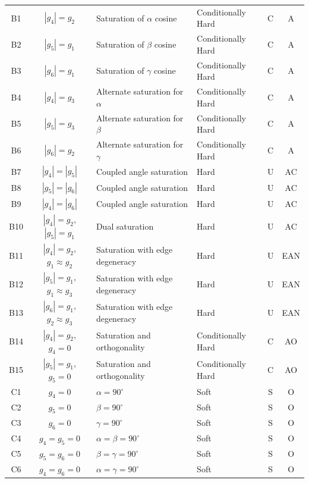 \documentclass[preprint]{iucr}              %
\begin{document}
\begin{longtable}{|c|c|p{5.2cm}|p{3.8cm}|c|c|}
	B1 & $|g_4| = g_2$ & Saturation of $\alpha$ cosine & Conditionally Hard & C & A \\
	B2 & $|g_5| = g_1$ & Saturation of $\beta$ cosine & Conditionally Hard & C & A \\
	B3 & $|g_6| = g_1$ & Saturation of $\gamma$ cosine & Conditionally Hard & C & A \\
	B4 & $|g_4| = g_3$ & Alternate saturation for $\alpha$ & Conditionally Hard & C & A \\
	B5 & $|g_5| = g_3$ & Alternate saturation for $\beta$ & Conditionally Hard & C & A \\
	B6 & $|g_6| = g_2$ & Alternate saturation for $\gamma$ & Conditionally Hard & C & A \\
	B7 & $|g_4| = |g_5|$ & Coupled angle saturation & Hard & U & AC \\
	B8 & $|g_5| = |g_6|$ & Coupled angle saturation & Hard & U & AC \\
	B9 & $|g_4| = |g_6|$ & Coupled angle saturation & Hard & U & AC \\
	B10 & $|g_4| = g_2$, $|g_5| = g_1$ & Dual saturation & Hard & U & AC \\
	B11 & $|g_4| = g_2$, $g_1 \approx g_2$ & Saturation with edge degeneracy & Hard & U & EAN \\
	B12 & $|g_5| = g_1$, $g_1 \approx g_3$ & Saturation with edge degeneracy & Hard & U & EAN \\
	B13 & $|g_6| = g_1$, $g_2 \approx g_3$ & Saturation with edge degeneracy & Hard & U & EAN \\
	B14 & $|g_4| = g_2$, $g_4 = 0$ & Saturation and orthogonality & Conditionally Hard & C & AO \\
	B15 & $|g_5| = g_1$, $g_5 = 0$ & Saturation and orthogonality & Conditionally Hard & C & AO \\
	
	C1 & $g_4 = 0$ & $\alpha = 90^\circ$ & Soft & S & O \\
	C2 & $g_5 = 0$ & $\beta = 90^\circ$ & Soft & S & O \\
	C3 & $g_6 = 0$ & $\gamma = 90^\circ$ & Soft & S & O \\
	C4 & $g_4 = g_5 = 0$ & $\alpha = \beta = 90^\circ$ & Soft & S & O \\
	C5 & $g_5 = g_6 = 0$ & $\beta = \gamma = 90^\circ$ & Soft & S & O \\
	C6 & $g_4 = g_6 = 0$ & $\alpha = \gamma = 90^\circ$ & Soft & S & O \\
	

\end{longtable}
\end{document}
